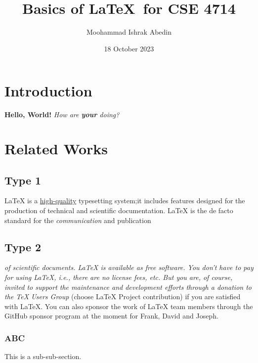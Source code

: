 \documentclass[12pt, a4paper]{article}
\title{Basics of \LaTeX\ for CSE 4714}
\author{Moohammad Ishrak Abedin}
\date{18 October 2023}
\begin{document}
    \begin{titlepage}
        \maketitle
        \tableofcontents
    \end{titlepage} 

    \begin{abstract}
        \lipsum[3]
    \end{abstract}

    \section{Introduction}
    \textbf{Hello, World!} \textit{How are \textbf{your} doing?}

    \pagebreak
    
    \section{Related Works}
    \subsection{Type 1}
    LaTeX is a \underline{high-quality} typesetting system;it includes features designed for the production of technical and scientific documentation. LaTeX is the de facto standard for the \emph{communication} and publication
    
    \subsection{Type 2}
        \begin{small}        
            \textit{of scientific documents. \emph{LaTeX} is available as free software. You don't have to pay for using LaTeX, i.e., there are no license fees, etc. But you are, of course, invited to support the maintenance and development efforts through a donation to the TeX Users Group }(choose LaTeX Project contribution) if you are satisfied with LaTeX. You can also sponsor the work of LaTeX team members through the GitHub sponsor program at the moment for Frank, David and Joseph.
        \end{small}
    
    \begin{center}
        \lipsum[1-2]
    \end{center}

    \pagebreak
    \subsubsection{ABC}
    This is a sub-sub-section.
\end{document}
